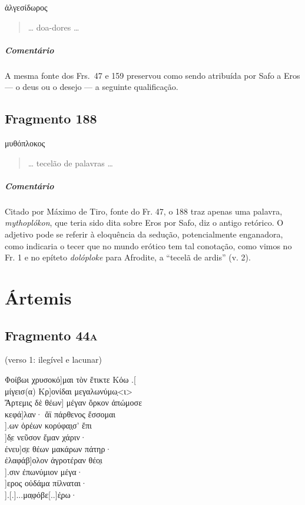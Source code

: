 {\begin{gkverse}
ἀλγεσίδωρος
\end{gkverse}

\begin{verse}
\ldots{} doa-dores \ldots{} 
\end{verse}

{\paragraph{Comentário} A mesma fonte dos Frs.~47 e 159 preservou como sendo atribuída por Safo a Eros --- o deus ou o desejo --- a seguinte qualificação.}


\section{Fragmento 188}

\begin{gkverse}
μυθόπλοκος
\end{gkverse}

\begin{verse}
\ldots{} tecelão de palavras \ldots{}
\end{verse}

{\paragraph{Comentário} Citado por Máximo de Tiro, fonte do Fr. 47, o 188 traz apenas uma palavra, \textit{mythoplókon}, que teria sido dita sobre Eros por Safo, diz o antigo retórico. O adjetivo pode se referir à eloquência da sedução, potencialmente enganadora, como indicaria o tecer que no mundo erótico tem tal conotação, como vimos no Fr. 1 e no epíteto \textit{dolóploke} para Afrodite, a ``tecelã de ardis'' (v. 2).}


\chapter{Ártemis}

\section{Fragmento 44\textsc{a}}

\begin{gkverse}
\textnormal{(verso 1: ilegível e lacunar)}

Φοίβωι χρυσοκό]μαι τὸν ἔτικτε Κόω .[\\
μίγεισ(α)         Κρ]ονίδαι μεγαλωνύμω̣<ι>\\
Ἄρτεμις δὲ θέων] μέγαν ὄρκον ἀπώμοσε\\
    κεφά]λαν· ἄϊ πάρθενος ἔσσομαι\\
             ].ων ὀρέων κορύφα̣ι̣σ’ ἔπι\\
    ]δ̣ε νεῦσον ἔμαν χάριν·\\
         ένευ]σ̣ε θέων μακάρων πάτηρ·\\
ἐλαφάβ]ολον ἀγροτέραν θέο̣ι\\
            ].σιν ἐπωνύμιον μέγα·\\
   ]ερος οὐδάμα πίλναται·\\
     ].[.]...μα̣φόβε[..]έ̣ρω·


\end{gkverse}}
